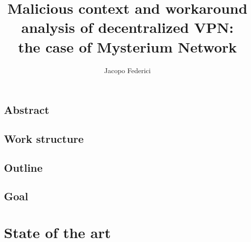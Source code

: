 \documentclass[]{article}
\title{Malicious context and workaround analysis of decentralized VPN:\\the case of Mysterium Network}
\author{Jacopo Federici}
\begin{document}
	\raggedright
	\maketitle	
	\clearpage
	
	\tableofcontents{}

	\subsection{Abstract}
	\subsection{Work structure}
	\subsection{Outline}
	\subsection{Goal}
	
	
	\section{State of the art}
\end{document}
